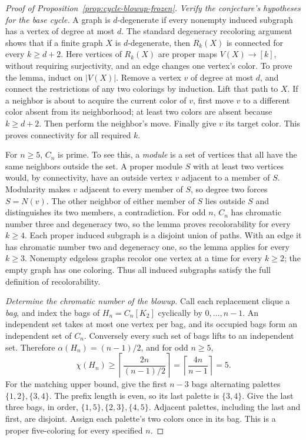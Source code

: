 \begin{proof}[Proof of Proposition~\ref{prop:cycle-blowup-frozen}]
\textit{Verify the conjecture's hypotheses for the base cycle.}
A graph is $d$-degenerate if every nonempty induced subgraph has a
vertex of degree at most $d$. The standard degeneracy recoloring
argument \citep{cereceda2008connectedness} shows that if a finite graph
$X$ is $d$-degenerate, then $R_k(X)$ is connected for every $k\ge d+2$.
Here vertices of $R_k(X)$ are proper maps $V(X)\to[k]$, without
requiring surjectivity, and an edge changes one vertex's color.
To prove the lemma, induct on $|V(X)|$. Remove a vertex $v$ of degree
at most $d$, and connect the restrictions of any two colorings by
induction. Lift that path to $X$. If a neighbor is about to acquire
the current color of $v$, first move $v$ to a different color absent
from its neighborhood; at least two colors are absent because
$k\ge d+2$. Then perform the neighbor's move. Finally give $v$ its
target color. This proves connectivity for all required $k$.

For $n\ge5$, $C_n$ is prime. To see this, a \emph{module} is a set of
vertices that all have the same neighbors outside the set. A proper
module $S$ with at least two vertices would, by connectivity, have an outside vertex
$v$ adjacent to a member of $S$. Modularity makes $v$ adjacent to
every member of $S$, so degree two forces $S=N(v)$. The other
neighbor of either member of $S$ lies outside $S$ and distinguishes
its two members, a contradiction. For odd $n$, $C_n$ has chromatic
number three and degeneracy two, so the lemma proves recolorability
for every $k\ge4$. Each proper induced subgraph is a disjoint union
of paths. With an edge it has chromatic number two and degeneracy
one, so the lemma applies for every $k\ge3$. Nonempty edgeless
graphs recolor one vertex at a time for every $k\ge2$; the empty
graph has one coloring. Thus all induced subgraphs satisfy the full
definition of recolorability.

\textit{Determine the chromatic number of the blowup.}
Call each replacement clique a \emph{bag}, and index the bags of
$H_n=C_n[K_2]$ cyclically by $0,\ldots,n-1$. An independent set takes at most one vertex per
bag, and its occupied bags form an independent set of $C_n$.
Conversely every such set of bags lifts to an independent set.
Therefore $\alpha(H_n)=(n-1)/2$, and for odd $n\ge5$,
\[
 \chi(H_n)\ge\left\lceil\frac{2n}{(n-1)/2}\right\rceil
 =\left\lceil\frac{4n}{n-1}\right\rceil=5.
\]
For the matching upper bound, give the first $n-3$ bags alternating
palettes $\{1,2\},\{3,4\}$. The prefix length is even, so its last
palette is $\{3,4\}$. Give the last three bags, in order,
$\{1,5\},\{2,3\},\{4,5\}$. Adjacent palettes, including the last
and first, are disjoint. Assign each palette's two colors once in
its bag. This is a proper five-coloring for every specified $n$.


\end{proof}
